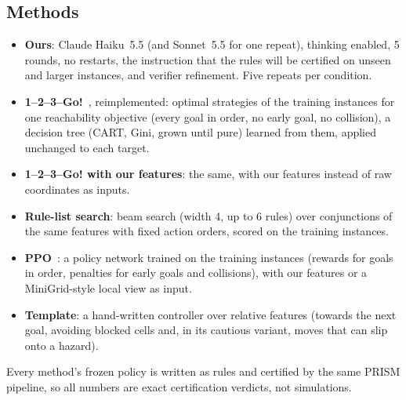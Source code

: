 \subsection{Methods}
\begin{itemize}
  \item \textbf{Ours}: Claude Haiku~5.5 (and Sonnet~5.5 for one repeat), thinking enabled, 5 rounds, no restarts, the
        instruction that the rules will be certified on unseen and larger instances, and verifier refinement. Five
        repeats per condition.
  \item \textbf{1--2--3--Go!}~\cite{azeem2025onetwothreego}, reimplemented: optimal strategies of the training
        instances for one reachability objective (every goal in order, no early goal, no collision), a decision tree
        (CART, Gini, grown until pure) learned from them, applied unchanged to each target.
  \item \textbf{1--2--3--Go! with our features}: the same, with our features instead of raw coordinates as inputs.
  \item \textbf{Rule-list search}: beam search (width 4, up to 6 rules) over conjunctions of the same features with
        fixed action orders, scored on the training instances.
  \item \textbf{PPO}~\cite{schulman2017ppo}: a policy network trained on the training instances (rewards for goals in
        order, penalties for early goals and collisions), with our features or a MiniGrid-style local view as input.
  \item \textbf{Template}: a hand-written controller over relative features (towards the next goal, avoiding blocked
        cells and, in its cautious variant, moves that can slip onto a hazard).
\end{itemize}
Every method's frozen policy is written as rules and certified by the same PRISM pipeline, so all numbers are
exact certification verdicts, not simulations.
